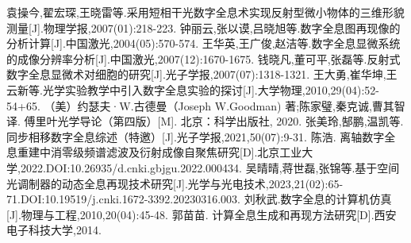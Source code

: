 \documentclass{WHUReport}
\begin{document}
\begin{multicols}{2}
	

	\begin{thebibliography}{99}  
		袁操今,翟宏琛,王晓雷等.采用短相干光数字全息术实现反射型微小物体的三维形貌测量[J].物理学报,2007(01):218-223.
		钟丽云,张以谟,吕晓旭等.数字全息图再现像的分析计算[J].中国激光,2004(05):570-574.
		王华英,王广俊,赵洁等.数字全息显微系统的成像分辨率分析[J].中国激光,2007(12):1670-1675.
		钱晓凡,董可平,张磊等.反射式数字全息显微术对细胞的研究[J].光子学报,2007(07):1318-1321.
		王大勇,崔华坤,王云新等.光学实验教学中引入数字全息实验的探讨[J].大学物理,2010,29(04):52-54+65.
		（美）约瑟夫·W.古德曼（Joseph W.Goodman) 著;陈家璧,秦克诚,曹其智 译. 傅里叶光学导论（第四版）[M]. 北京：科学出版社, 2020.
		张美玲,郜鹏,温凯等.同步相移数字全息综述（特邀）[J].光子学报,2021,50(07):9-31.
		陈浩. 离轴数字全息重建中消零级频谱滤波及衍射成像自聚焦研究[D].北京工业大学,2022.DOI:10.26935/d.cnki.gbjgu.2022.000434.
		吴晴晴,蒋世磊,张锦等.基于空间光调制器的动态全息再现技术研究[J].光学与光电技术,2023,21(02):65-71.DOI:10.19519/j.cnki.1672-3392.20230316.003.
		刘秋武.数字全息的计算机仿真[J].物理与工程,2010,20(04):45-48.
		郭苗苗. 计算全息生成和再现方法研究[D].西安电子科技大学,2014.
	\end{thebibliography}
\end{multicols}
\end{document}
